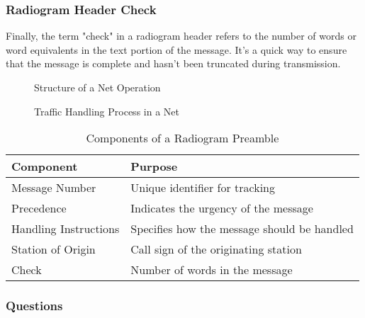 \subsubsection*{Radiogram Header Check}
Finally, the term "check" in a radiogram header refers to the number of words or word equivalents in the text portion of the message. It's a quick way to ensure that the message is complete and hasn't been truncated during transmission.

\begin{figure}[h]
    \centering
    \caption{Structure of a Net Operation}
    \label{fig:net-structure}
\end{figure}

\begin{figure}[h]
    \centering
    \caption{Traffic Handling Process in a Net}
    \label{fig:traffic-handling}
\end{figure}

\begin{table}[h]
    \centering
    \begin{tabular}{|l|l|}
        \hline
        \textbf{Component} & \textbf{Purpose} \\
        \hline
        Message Number & Unique identifier for tracking \\
        Precedence & Indicates the urgency of the message \\
        Handling Instructions & Specifies how the message should be handled \\
        Station of Origin & Call sign of the originating station \\
        Check & Number of words in the message \\
        \hline
    \end{tabular}
    \caption{Components of a Radiogram Preamble}
    \label{tab:radiogram-preamble}
\end{table}

\subsubsection*{Questions}

